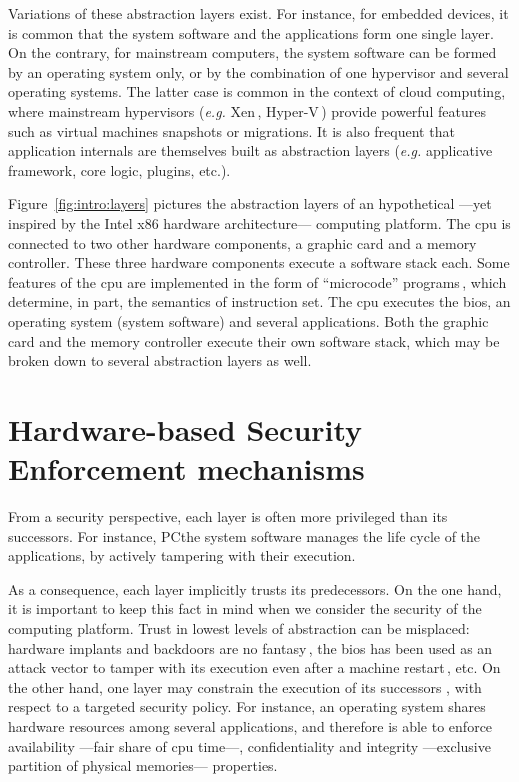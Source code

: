 Variations of these abstraction layers exist.
%
For instance, for embedded devices, it is common that the system software and
the applications form one single layer.
%
On the contrary, for mainstream computers, the system software can be formed by
an operating system only, or by the combination of one hypervisor and several
operating systems.
%
The latter case is common in the context of cloud computing, where mainstream
hypervisors (\emph{e.g.} Xen\,\cite{barham2003xen},
Hyper-V\,\cite{velte2009hyperv}) provide powerful features such as virtual
machines snapshots or migrations.
%
It is also frequent that application internals are themselves built as
abstraction layers (\emph{e.g.} applicative framework, core logic, plugins,
etc.).

Figure~\ref{fig:intro:layers} pictures the abstraction layers of an hypothetical
---yet inspired by the Intel x86 hardware architecture--- computing platform.
%
The \ac{cpu} is connected to two other hardware components, a graphic card and a
memory controller.
%
These three hardware components execute a software stack each.
%
Some features of the \ac{cpu} are implemented in the form of ``microcode''
programs\,\cite{chen2014microcode}, which determine, in part, the semantics of
instruction set.
%
The \ac{cpu} executes the \ac{bios}, an operating system (system software) and
several applications.
%
Both the graphic card and the memory controller execute their own software
stack, which may be broken down to several abstraction layers as well.

\section{Hardware-based Security Enforcement mechanisms}

From a security perspective, each layer is often more privileged than its
successors.
%
For instance, PC{the} system software manages the life cycle of the applications, by
actively tampering with their execution.

As a consequence, each layer implicitly trusts its predecessors.
%
On the one hand, it is important to keep this fact in mind when we consider the
security of the computing platform.
%
Trust in lowest levels of abstraction can be misplaced: hardware implants and
backdoors are no fantasy\,\cite{yang2016a2}, the \ac{bios} has been used as an
attack vector to tamper with its execution even after a machine
restart\,\cite{embleton2013smm}, etc.
%
On the other hand, one layer may constrain the execution of its successors
, with respect to a targeted security policy.
%
For instance, an operating system shares hardware resources among several
applications, and therefore is able to enforce availability ---fair share of
\ac{cpu} time---, confidentiality and integrity ---exclusive partition of
physical memories--- properties.

